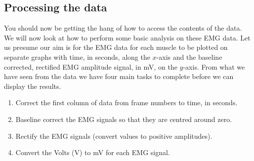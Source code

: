 \documentclass[12pt,a4paper]{article}
\begin{document}
\subsection{Processing the data}
You should now be getting the hang of how to access the contents of the data.  
We will now look at how to perform some basic analysis on these EMG data.  
Let us presume our aim is for the EMG data for each muscle to be plotted on separate graphs with time, in seconds, along the $x$-axis and the baseline corrected, rectified EMG amplitude signal, in mV, on the $y$-axis.  
From what we have seen from the data we have four main tasks to complete before we can display the results.
\begin{enumerate}
	\item Correct the first column of data from frame numbers to time, in seconds.	
	\item Baseline correct the EMG signals so that they are centred around zero.
	\item Rectify the EMG signals (convert values to positive amplitudes).
	\item Convert the Volts (V) to mV for each EMG signal.
\end{enumerate}
\end{document}
